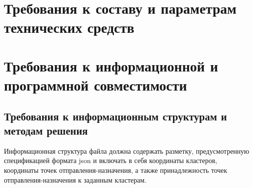 \section{Требования к составу и параметрам технических средств}



\section{Требования к информационной и программной совместимости}
\subsection{Требования к информационным структурам и методам решения}
Информационная структура файла должна содержать разметку, предусмотренную спецификацией формата json и 
включать в себя координаты кластеров, координаты точек отправления-назначения, а также принадлежность точек 
отправления-назначения к заданным кластерам.

